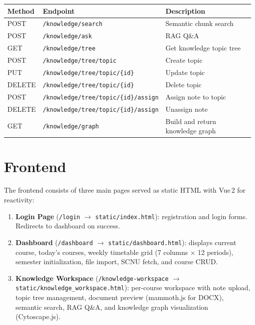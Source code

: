 \documentclass[12pt,a4paper]{article}
\begin{document}
\begin{longtable}{@{}llp{7cm}@{}}
\toprule
\textbf{Method} & \textbf{Endpoint} & \textbf{Description} \\
\midrule
\endhead
POST & \texttt{/knowledge/search} & Semantic chunk search \\
POST & \texttt{/knowledge/ask} & RAG Q\&A \\
GET & \texttt{/knowledge/tree} & Get knowledge topic tree \\
POST & \texttt{/knowledge/tree/topic} & Create topic \\
PUT & \texttt{/knowledge/tree/topic/\{id\}} & Update topic \\
DELETE & \texttt{/knowledge/tree/topic/\{id\}} & Delete topic \\
POST & \texttt{/knowledge/tree/topic/\{id\}/assign} & Assign note to topic \\
DELETE & \texttt{/knowledge/tree/topic/\{id\}/assign} & Unassign note \\
GET & \texttt{/knowledge/graph} & Build and return knowledge graph \\
\bottomrule
\end{longtable}

\section{Frontend}
\label{sec:frontend}

The frontend consists of three main pages served as static HTML with Vue\,2 for reactivity:

\begin{enumerate}[nosep]
    \item \textbf{Login Page} (\texttt{/login} $\to$ \texttt{static/index.html}): registration and login forms. Redirects to dashboard on success.
    \item \textbf{Dashboard} (\texttt{/dashboard} $\to$ \texttt{static/dashboard.html}): displays current course, today's courses, weekly timetable grid (7 columns $\times$ 12 periods), semester initialization, file import, SCNU fetch, and course CRUD.
    \item \textbf{Knowledge Workspace} (\texttt{/knowledge-workspace} $\to$ \texttt{static/knowledge\_workspace.html}): per-course workspace with note upload, topic tree management, document preview (mammoth.js for DOCX), semantic search, RAG Q\&A, and knowledge graph visualization (Cytoscape.js).
\end{enumerate}
\end{document}
